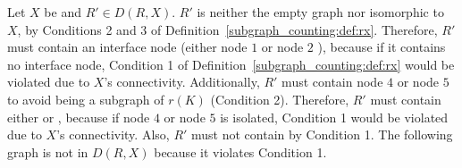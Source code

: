 \begin{example}
\begin{center}
    \end{center}
    Let $X$ be  and $R' \mathop{\in} D(R,X)$. 
    $R'$ is neither the empty graph nor isomorphic to $X$, by Conditions 2 and 3 of Definition~\ref{subgraph_counting:def:rx}. 
    Therefore, $R'$ must contain an interface node (either node $1$ 
     or node $2$
    ), because if it contains no interface node, Condition 1 of Definition~\ref{subgraph_counting:def:rx} would be violated due to $X$'s connectivity.
    Additionally, $R'$ must contain node $4$
     or node $5$
    to avoid being a subgraph of $r(K)$ (Condition 2). 
    Therefore, $R'$ must contain either 
      or 
    , because if node $4$
     or node $5$
    is isolated, Condition 1 would be violated due to $X$'s connectivity.
    Also, $R'$ must not contain 
    by Condition 1.
    The following graph
    is not in $D(R,X)$ because it violates Condition 1.

\end{example}
